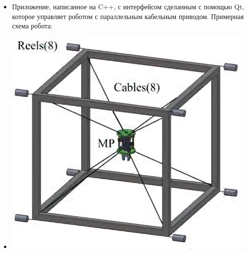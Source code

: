 \documentclass[10pt,a4paper,ragged2e]{altacv}
\begin{document}
\smallskip
{}
\begin{itemize}
\item Приложение, написанное на C++, с интерфейсом сделанным с помощью Qt, которое управляет роботом с параллельным кабельным приводом. Примерная схема робота:
\item \includegraphics[scale=0.3]{Cube.jpg} 
\end{itemize}
\smallskip

\smallskip
{}
\smallskip
{}
\smallskip




\end{document}
